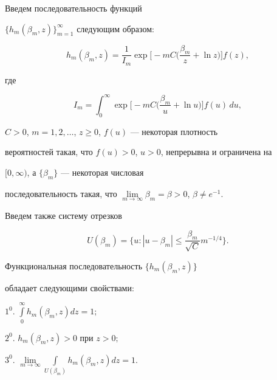 Введем последовательность функций


$\{h_m(\beta_m,z)\}_{m=1}^\infty$ следующим образом:


\begin{equation}


h_m(\beta_m,z)=\frac1{I_m}\exp\bigg[-mC\bigg(\frac{\beta_m}z+\ln


z\bigg)\bigg]f(z),


\label{thelast}


\end{equation}


где


$$


I_m=\int_0^\infty\exp\bigg[-mC\bigg(\frac{\beta_m}u+\ln u\bigg)


\bigg]f(u)\,du,


$$


$C>0$, $m=1,2,\dotsc$, $z\ge0$, $f(u)$ --- некоторая плотность


вероятностей такая, что $f(u)>0$, $u>0$, непрерывна и ограничена на


$[0,\infty)$, а $\{\beta_m\}$ --- некоторая числовая


последовательность такая, что $\lim\limits_


{m\to\infty}\beta_m=\beta>0$, $\beta\ne e^{-1}$.


Введем также систему отрезков


$$


U(\beta_m)=\bigg\{u:|u-\beta_m|\le\frac{\beta_m}{\sqrt{C}}m^{-1/4}\bigg\}.


$$








\begin{lem}


Функциональная последовательность $\{h_m(\beta_m,z)\}$


обладает следующими свойствами\/${:}$





$1^0$. $\int\limits_0^\infty h_m(\beta_m,z)dz=1;$





$2^0$. $h_m(\beta_m,z)>0$ при $z>0;$





$3^0$. $\lim\limits_{m\to\infty}\int\limits_{U(\beta_m)}h_m(\beta_m,z)dz=1$.


\end{lem}





